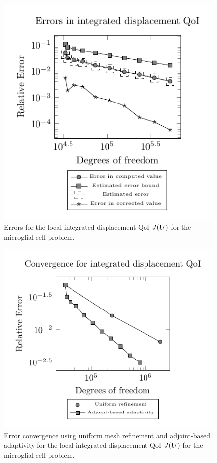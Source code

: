 \begin{figure}[ht!]
\centering
\includegraphics[width=.75\linewidth]{img/mech_glial_error_plot.pdf}
\caption{Errors for the local integrated displacement QoI $J(\boldsymbol{U})$ for the
microglial cell problem.}
\label{fig:mech_glial_error}
\end{figure}

\begin{figure}[ht!]
\centering
\includegraphics[width=.8\linewidth]{img/mech_glial_convergence_plot}
\caption{Error convergence using uniform mesh refinement and
adjoint-based adaptivity for the local integrated displacement QoI
$J(\boldsymbol{U})$ for the microglial cell problem.}
\label{fig:mech_glial_convergence}
\end{figure}

